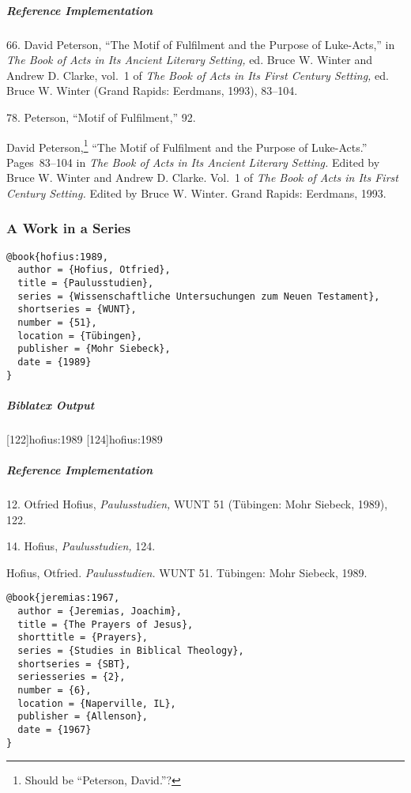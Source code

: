 \documentclass[a4paper]{article}
\newenvironment{biboutput}{%
  \subparagraph{Biblatex Output}
}{\color{black}}
\newenvironment{refimp}{%
  \subparagraph{Reference Implementation}
  \color{reference-colour}
  \rm
}{\par\color{black}}
\begin{document}
\begin{refimp}
  66. David Peterson, “The Motif of Fulfilment and the Purpose of Luke-Acts,”
  in \emph{The Book of Acts in Its Ancient Literary Setting,} ed. Bruce W.
  Winter and Andrew D. Clarke, vol.~1 of \emph{The Book of Acts in Its First
  Century Setting,} ed. Bruce W. Winter (Grand Rapids: Eerdmans, 1993),
  83–104.

  78. Peterson, “Motif of Fulfilment,” 92.

  \hangindent\bibindent David Peterson,\footnote{Should be “Peterson,
  David.”?} “The Motif of Fulfilment and the Purpose of Luke-Acts.”
  Pages~83–104 in \emph{The Book of Acts in Its Ancient Literary Setting.}
  Edited by Bruce W. Winter and Andrew D. Clarke. Vol.~1 of \emph{The Book of
  Acts in Its First Century Setting.} Edited by Bruce W. Winter. Grand Rapids:
  Eerdmans, 1993.
\end{refimp}

\subsubsection{A Work in a Series}

\begin{lstlisting}
@book{hofius:1989,
  author = {Hofius, Otfried},
  title = {Paulusstudien},
  series = {Wissenschaftliche Untersuchungen zum Neuen Testament},
  shortseries = {WUNT},
  number = {51},
  location = {Tübingen},
  publisher = {Mohr Siebeck},
  date = {1989}
}
\end{lstlisting}  

\begin{biboutput}
  [122]{hofius:1989}
  [124]{hofius:1989}
\end{biboutput}

\begin{refimp}
  12. Otfried Hofius, \emph{Paulusstudien,} WUNT 51 (Tübingen: Mohr Siebeck,
  1989), 122.

  14. Hofius, \emph{Paulusstudien,} 124.

  Hofius, Otfried. \emph{Paulusstudien.} WUNT 51. Tübingen: Mohr Siebeck,
  1989.
  
\end{refimp}

\medskip

\begin{lstlisting}
@book{jeremias:1967,
  author = {Jeremias, Joachim},
  title = {The Prayers of Jesus},
  shorttitle = {Prayers},
  series = {Studies in Biblical Theology},
  shortseries = {SBT},
  seriesseries = {2},
  number = {6},
  location = {Naperville, IL},
  publisher = {Allenson},
  date = {1967}
}
\end{lstlisting}
\end{document}
